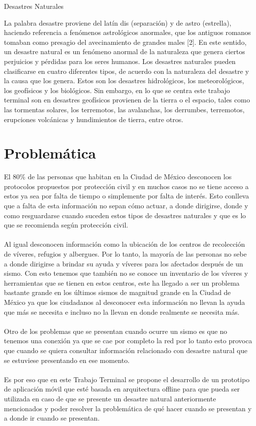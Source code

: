 Desastres Naturales 

La palabra desastre proviene del latín dis (separación) y de astro (estrella), haciendo referencia a fenómenos astrológicos anormales, que los antiguos romanos tomaban como presagio del avecinamiento de grandes males [2]. En este sentido, un desastre natural es un fenómeno anormal de la naturaleza que genera ciertos perjuicios y pérdidas para los seres humanos.
Los desastres naturales pueden clasificarse en cuatro diferentes tipos, de acuerdo con la naturaleza del desastre y la causa que los genera. Estos son los desastres hidrológicos, los meteorológicos, los geofísicos y los biológicos.
Sin embargo, en lo que se centra este trabajo terminal son en desastres geofísicos provienen de la tierra o el espacio, tales como las tormentas solares, los terremotos, las avalanchas, los derrumbes, terremotos, erupciones volcánicas y hundimientos de tierra, entre otros.

\section{Problemática}
El 80\% de las personas que habitan en la Ciudad de México desconocen los protocolos propuestos por protección civil y en muchos casos no se tiene acceso a estos ya sea por falta de tiempo o simplemente por falta de interés. Esto conlleva que a falta de esta información no sepan cómo actuar, a donde dirigirse, donde y como resguardarse cuando suceden estos tipos de desastres naturales y que es lo que se recomienda según protección civil.
\\\\Al igual desconocen información como la ubicación de los centros de recolección de víveres, refugios y albergues. Por lo tanto, la mayoría de las personas no sebe a donde dirigirse a brindar su ayuda y víveres para los afectados después de un sismo. Con esto tenemos que también no se conoce un inventario de los víveres y herramientas que se tienen en estos centros, este ha llegado a ser un problema bastante grande en los últimos sismos de magnitud grande en la Ciudad de México ya que los ciudadanos al desconocer esta información no llevan la ayuda que más se necesita e incluso no la llevan en donde realmente se necesita más.
\\\\Otro de los problemas que se presentan cuando ocurre un sismo es que no tenemos una conexión ya que se cae por completo la red por lo tanto esto provoca que cuando se quiera consultar información relacionado con desastre natural que se estuviese presentando en ese momento.
\\\\Es por eso que en este Trabajo Terminal se propone el desarrollo de un prototipo de aplicación móvil que esté basada en arquitectura offline para que pueda ser utilizada en caso de que se presente un desastre natural anteriormente mencionados y poder resolver la problemática de qué hacer cuando se presentan y a donde ir cuando se presentan.

